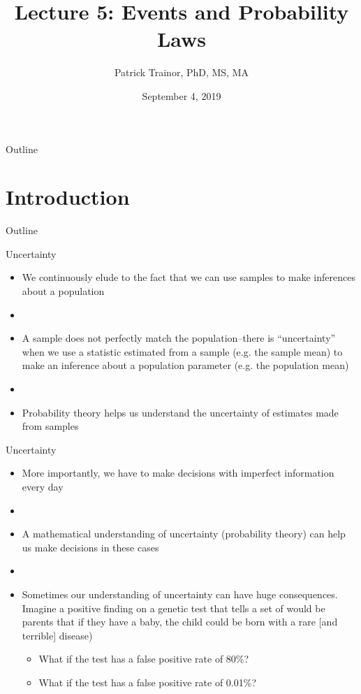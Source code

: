 \documentclass[xcolor=dvipsnames]{beamer}
\title[Lecture 5]{Lecture 5: Events and Probability Laws}
\author[Patrick Trainor]{Patrick Trainor, PhD, MS, MA}
\institute[NMSU]{New Mexico State University}
\date{September 4, 2019}
\begin{document}
\begin{frame}
\maketitle
\end{frame}

\begin{frame}{Outline}
\tableofcontents[hideallsubsections]
\end{frame}

\section{Introduction}
\begin{frame}{Outline}
	\tableofcontents[currentsection,subsectionstyle=show/shaded/hide]
\end{frame}

\begin{frame}{Uncertainty}
	\begin{itemize}
		\item We continuously elude to the fact that we can use samples to make inferences about a population
		\item[]
		\item A sample does not perfectly match the population--there is ``uncertainty'' when we use a statistic estimated from a sample (e.g. the sample mean) to make an inference about a population parameter (e.g. the population mean)
		\item[]
		\item Probability theory helps us understand the uncertainty of estimates made from samples
	\end{itemize}
\end{frame}

\begin{frame}{Uncertainty}
\begin{itemize}
	\item More importantly, we have to make decisions with imperfect information every day
	\item[]
	\item A mathematical understanding of uncertainty (probability theory) can help us make decisions in these cases
	\item[]
	\item Sometimes our understanding of uncertainty can have huge consequences. Imagine a positive finding on a genetic test that tells a set of would be parents that if they have a baby, the child could be born with a rare [and terrible] disease)
	\begin{itemize}
		\item What if the test has a false positive rate of 80\%?
		\item What if the test has a false positive rate of 0.01\%?
	\end{itemize}
\end{itemize}
\end{frame}
\end{document}
